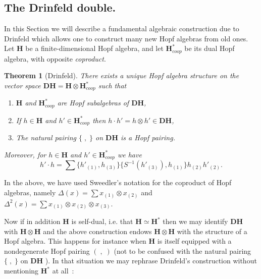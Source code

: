 \documentclass[a4paper,10pt]{amsart}
\def\H{\mathbf{H}}
\newtheorem{theo}{\bf{Theorem}}[section]
\numberwithin{equation}{section}
\begin{document}
{\vspace{.2in}

\subsection{The Drinfeld double.}

\vspace{.15in}

In this Section we will describe a fundamental algebraic construction due to Drinfeld which allows one to construct many new Hopf algebras from old ones.
Let $\H$ be a finite-dimensional Hopf algebra, and let $\H_{coop}^*$ be its dual Hopf algebra, with opposite \textit{coproduct}.

\vspace{.1in}

\begin{theo}[Drinfeld] There exists a unique Hopf algebra structure on the vector space $\mathbf{D}\H=\H \otimes \H^*_{coop}$ such that
\begin{enumerate}
\item[i)] $\H$ and $\H_{coop}^*$ are Hopf subalgebras of $\mathbf{D}\H$,
\item[ii)] If $h \in \H$ and $h' \in \H^*_{coop}$ then $h \cdot h'=h \otimes h' \in \mathbf{D}\H$,
\item[iii)] The natural pairing $\{\;,\;\}$ on $\mathbf{D}\H$ is a Hopf pairing.
\end{enumerate}
Moreover, for $h \in \H$ and $h' \in \H^*_{coop}$ we have
$$h' \cdot h=\sum \{h'_{(1)},h_{(3)}\}\{S^{-1}(h'_{(3)}),h_{(1)}\}h_{(2)}h'_{(2)}.$$
\end{theo}

In the above, we have used Sweedler's notation for the coproduct of Hopf algebras, namely
$\Delta(x)=\sum x_{(1)} \otimes x_{(2)}$ and $\Delta^2(x)=\sum x_{(1)} \otimes x_{(2)} \otimes x_{(3)}$.

\vspace{.1in}

Now if in addition $\H$ is self-dual, i.e. that $\H \simeq \H^*$ then we may identify $\mathbf{D}\H$ with $\H \otimes \H$ and the above construction endows $\H \otimes \H$ with the structure of a Hopf algebra. This happens for instance when $\H$ is itself equipped with a nondegenerate Hopf pairing
$(\;,\;)$ (not to be confused with the natural pairing $\{\;,\;\}$ on $\mathbf{D}\H$ ). In that situation we may rephrase Drinfeld's construction without mentioning $\H^*$ at all~:

}
\end{document}
